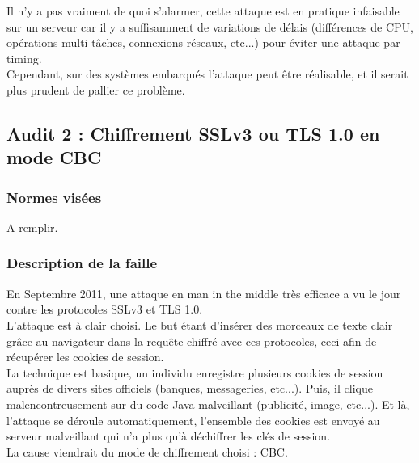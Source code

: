 			Il n'y a pas vraiment de quoi s'alarmer, cette attaque est en pratique infaisable sur un serveur car il y a suffisamment de variations de délais (différences de CPU, opérations multi-tâches, connexions réseaux, etc...) pour éviter une attaque par timing.\\
			
			Cependant, sur des systèmes embarqués l'attaque peut être réalisable, et il serait plus prudent de pallier ce problème.
			
	\subsection{Audit 2 : Chiffrement SSLv3 ou TLS 1.0 en mode CBC}
		\subsubsection{Normes visées}
	
			A remplir.	
	
		\subsubsection{Description de la faille}
			
			En Septembre 2011, une attaque en man in the middle très efficace a vu le jour contre les protocoles SSLv3 et TLS 1.0. \cite{ekr2011beast} \cite{imperial2011beast} \cite{goodin2011beast} \cite{gallagher2011beast}\\
			
			L'attaque est à clair choisi. Le but étant d'insérer des morceaux de texte clair grâce au navigateur dans la requête chiffré avec ces protocoles, ceci afin de récupérer les cookies de session.\\
			
			La technique est basique, un individu enregistre plusieurs cookies de session auprès de divers sites officiels (banques, messageries, etc...). Puis, il clique malencontreusement sur du code Java malveillant (publicité, image, etc...). Et là, l'attaque se déroule automatiquement, l'ensemble des cookies est envoyé au serveur malveillant qui n'a plus qu'à déchiffrer les clés de session.\\
			
			La cause viendrait du mode de chiffrement choisi : CBC.\\
		
